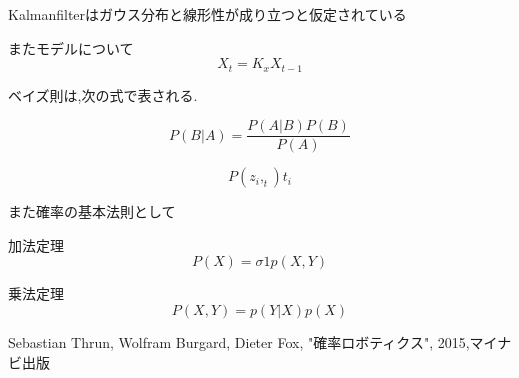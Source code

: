 \documentclass[12pt]{jsarticle}
\begin{document}
Kalmanfilterはガウス分布と線形性が成り立つと仮定されている

またモデルについて
\begin{equation}
  X_t=K_xX_{t-1}
\end{equation}

ベイズ則は,次の式で表される.

\begin{equation}
  P(B|A) = \frac{P(A|B)P(B)}{P(A)}
\end{equation}

\begin{equation}
 P(z_i,_t){t_i}
\end{equation}

また確率の基本法則として

加法定理
\begin{equation}
  P(X)=\sigma{1}{p(X,Y)}
\end{equation}

乗法定理
\begin{equation}
  P(X,Y)=p(Y|X)p(X)
\end{equation}

\begin{thebibliography}{9}
  Sebastian Thrun, Wolfram Burgard, Dieter Fox, "確率ロボティクス", 2015,マイナビ出版 
\end{thebibliography}
\end{document}

